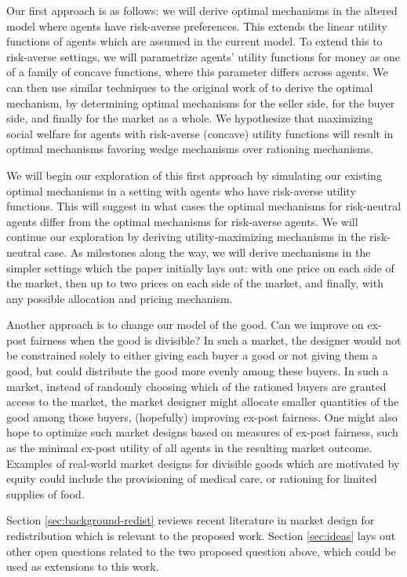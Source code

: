 \documentclass[AER]{AEA}
\begin{document}
Our first approach is as follows: we will derive optimal mechanisms in the altered model where agents have risk-averse preferences. This extends the linear utility functions of agents which are assumed in the current model. To extend this to risk-averse settings, we will parametrize agents' utility functions for money as one of a family of concave functions, where this parameter differs across agents. We can then use similar techniques to the original work of \cite{dworczak-2020} to derive the optimal mechanism, by determining optimal mechanisms for the seller side, for the buyer side, and finally for the market as a whole. We hypothesize that maximizing social welfare for agents with risk-averse (concave) utility functions will result in optimal mechanisms favoring wedge mechanisms over rationing mechanisms.

We will begin our exploration of this first approach by simulating our existing optimal mechanisms in a setting with agents who have risk-averse utility functions. This will suggest in what cases the optimal mechanisms for risk-neutral agents differ from the optimal mechanisms for risk-averse agents. We will continue our exploration by deriving utility-maximizing mechanisms in the risk-neutral case. As milestones along the way, we will derive mechanisms in the simpler settings which the paper initially lays out: with one price on each side of the market, then up to two prices on each side of the market, and finally, with any possible allocation and pricing mechanism.

Another approach is to change our model of the good. Can we improve on ex-post fairness when the good is divisible? In such a market, the designer would not be constrained solely to either giving each buyer a good or not giving them a good, but could distribute the good more evenly among these buyers. In such a market, instead of randomly choosing which of the rationed buyers are granted access to the market, the market designer might allocate smaller quantities of the good among those buyers, (hopefully) improving ex-post fairness. One might also hope to optimize such market designs based on measures of ex-post fairness, such as the minimal ex-post utility of all agents in the resulting market outcome. Examples of real-world market designs for divisible goods which are motivated by equity could include the provisioning of medical care, or rationing for limited supplies of food.

Section \ref{sec:background-redist} reviews recent literature in market design for redistribution which is relevant to the proposed work. Section \ref{sec:ideas} lays out other open questions related to the two proposed question above, which could be used as extensions to this work.
\end{document}
